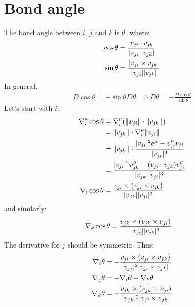 \documentclass{article}
\DeclarePairedDelimiter{\norm}{\lvert}{\rvert}
\DeclarePairedDelimiter{\normed}{\lVert}{\rVert}
\newcommand{\cross}{\times}
\begin{document}
  \section*{Bond angle}
  The bond angle between $i$, $j$ and $k$ is $\theta$, where:
  \begin{align*}
    \cos{\theta} &= \frac{v_{ji} \cdot v_{jk}}{\norm{v_{ji}}\norm{v_{jk}}}\\
    \sin{\theta} &= \frac{\norm{v_{ji} \cross v_{jk}}}{\norm{v_{ji}}\norm{v_{jk}}}
  \end{align*}
  In general,
  \begin{align*}
    D\cos{\theta} = -\sin{\theta} D\theta \implies D\theta = -\frac{D\cos{\theta}}{\sin{\theta}}
  \end{align*}
  Let's start with $i$:
  \begin{align*}
    \nabla_i^\mu \cos{\theta} &= \nabla_i^\mu (\normed{v_{ji}} \cdot \normed{v_{jk}})\\
    &= \normed{v_{jk}} \cdot \nabla_i^\mu \normed{v_{ji}}\\
    &= \normed{v_{jk}} \cdot \frac{\norm{v_{ji}}^2 e^\mu - v_{ji}^\mu v_{ji}}{\norm{v_{ji}}^3}\\
    &= \frac{\norm{v_{ji}}^2 v_{jk}^\mu - (v_{ji} \cdot v_{jk})v_{ji}^\mu}{\norm{v_{jk}}\norm{v_{ji}}^3}\\
    \nabla_i \cos{\theta} &= \frac{v_{ji} \cross (v_{ji} \cross v_{jk})}{\norm{v_{jk}}\norm{v_{ji}}^3}
  \end{align*}
  and similarly:
  \begin{align*}
    \nabla_k \cos{\theta} &= \frac{v_{jk} \cross (v_{jk} \cross v_{ji})}{\norm{v_{ji}}\norm{v_{jk}}^3}
  \end{align*}
  The derivative for $j$ should be symmetric. Thus:
  \begin{align*}
    \nabla_i \theta &= -\frac{v_{ji} \cross (v_{ji} \cross v_{jk})}{\norm{v_{ji}}^2 \norm{v_{ji} \cross v_{jk}}}\\
    \nabla_j \theta &= -\nabla_i \theta -\nabla_k \theta\\
    \nabla_k \theta &= -\frac{v_{jk} \cross (v_{jk} \cross v_{ji})}{\norm{v_{jk}}^2 \norm{v_{ji} \cross v_{jk}}}\\
  \end{align*}
\end{document}
